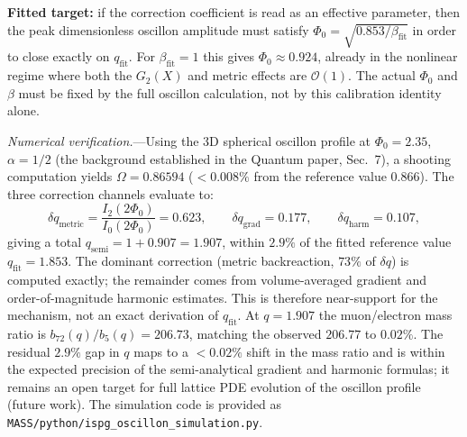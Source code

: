 \documentclass[11pt]{article}
\begin{document}
\textbf{Fitted target:} if the correction coefficient is
read as an effective parameter, then the peak dimensionless
oscillon amplitude must satisfy
$\Phi_0 = \sqrt{0.853/\beta_{\mathrm{fit}}}$ in order to
close exactly on $q_{\mathrm{fit}}$.  For
$\beta_{\mathrm{fit}} = 1$ this gives
$\Phi_0 \approx 0.924$, already in the nonlinear regime
where both the $G_2(X)$ and metric effects are
$\mathcal{O}(1)$.  The actual $\Phi_0$ and $\beta$ must be
fixed by the full oscillon calculation, not by this
calibration identity alone.

\begin{center}
\end{center}

\medskip
\textit{Numerical verification.}---Using the 3D spherical
oscillon profile at $\Phi_0 = 2.35$, $\alpha = 1/2$ (the
background established in the Quantum paper, Sec.~7), a
shooting computation yields $\Omega = 0.86594$
($< 0.008\%$ from the reference value $0.866$).
The three correction channels evaluate to:
\begin{equation}
  \delta q_{\mathrm{metric}} = \frac{I_2(2\Phi_0)}
    {I_0(2\Phi_0)} = 0.623,
  \qquad
  \delta q_{\mathrm{grad}} = 0.177,
  \qquad
  \delta q_{\mathrm{harm}} = 0.107,
  \label{eq:dq_numerical}
\end{equation}
giving a total $q_{\mathrm{semi}} = 1 + 0.907 = 1.907$,
within $2.9\%$ of the fitted reference value
$q_{\mathrm{fit}} = 1.853$. The dominant correction
(metric backreaction, $73\%$ of $\delta q$) is computed
exactly; the remainder comes from volume-averaged gradient
and order-of-magnitude harmonic estimates. This is therefore
near-support for the mechanism, not an exact derivation of
$q_{\mathrm{fit}}$. At $q = 1.907$
the muon/electron mass ratio is
$b_{72}(q)/b_5(q) = 206.73$, matching the observed
$206.77$ to $0.02\%$. The residual $2.9\%$ gap in $q$
maps to a $< 0.02\%$ shift in the mass ratio and is within
the expected precision of the semi-analytical gradient and
harmonic formulas; it remains an open target for full lattice
PDE evolution of the oscillon profile (future work).
The simulation code is provided as
\texttt{MASS/python/ispg\_oscillon\_simulation.py}.
\end{document}
